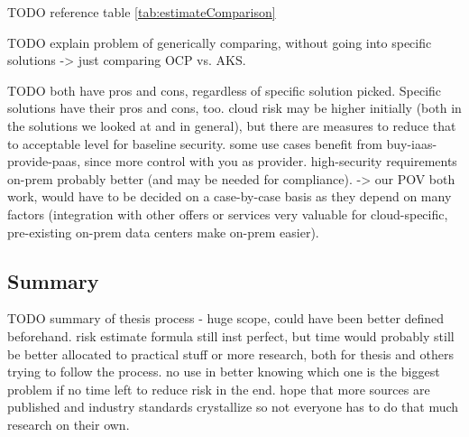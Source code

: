 TODO reference table \ref{tab:estimateComparison}

TODO explain problem of generically comparing, without going into specific solutions -> just comparing OCP vs. AKS.

TODO both have pros and cons, regardless of specific solution picked.  Specific solutions have their pros and cons, too. cloud risk may be higher initially (both in the solutions we looked at and in general), but there are measures to reduce that to acceptable level for baseline security. some use cases benefit from buy-iaas-provide-paas, since more control with you as provider. high-security requirements on-prem probably better (and may be needed for compliance). -> our POV both work, would have to be decided on a case-by-case basis as they depend on many factors (integration with other offers or services very valuable for cloud-specific, pre-existing on-prem data centers make on-prem easier).


\subsection{Summary}

TODO summary of thesis process - huge scope, could have been better defined beforehand. risk estimate formula still inst perfect, but time would probably still be better allocated to practical stuff or more research, both for thesis and others trying to follow the process. no use in better knowing which one is the biggest problem if no time left to reduce risk in the end. hope that more sources are published and industry standards crystallize so not everyone has to do that much research on their own.

